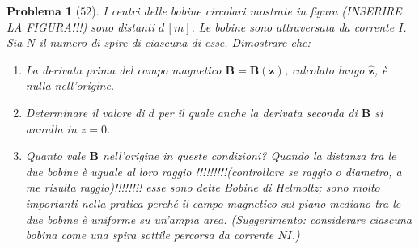 \documentclass[a4paper,oneside]{article}
\newtheorem{problema}{Problema}
\renewcommand{\vec}[1]{\mathbf{#1}}
\renewcommand{\hat}[1]{\widehat{\mathbf{#1}}}
\begin{document}
\begin{problema}[$52$]
	I centri delle bobine circolari mostrate in figura (INSERIRE LA FIGURA!!!)
	sono distanti $d\,[m]$. 
	Le bobine sono attraversata da corrente $I$. Sia $N$ il numero di spire di ciascuna di esse. 
	Dimostrare che:
	\begin{enumerate}
		\item La derivata prima del campo magnetico $\vec{B} = \vec{B(z)}$, 
		calcolato lungo $\hat{z}$, è nulla nell'origine.
		\item Determinare il valore di $d$ per il quale anche la 
		derivata seconda di $\vec{B}$ si annulla in $z = 0$.
		\item Quanto vale $\vec{B}$ nell'origine in queste condizioni?
		Quando la distanza tra le due bobine è uguale al loro raggio 
		!!!!!!!!!(controllare se raggio o diametro, a me risulta raggio)!!!!!!!! 
		esse sono dette Bobine di Helmoltz; sono molto importanti 
		nella pratica perché 
		il campo magnetico sul piano
		mediano tra le due bobine è uniforme su un'ampia area.
		(Suggerimento: considerare ciascuna bobina come 
		una spira sottile percorsa da corrente $NI$.)
	\end{enumerate}
\end{problema}
\end{document}

